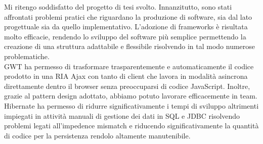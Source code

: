 Mi ritengo soddisfatto del progetto di tesi svolto.
Innanzitutto, sono stati affrontati
problemi pratici che riguardano la produzione di software, sia dal lato progettuale sia da quello implementativo.
L'adozione di frameworks è risultata molto efficacie, rendendo lo sviluppo del software più semplice permettendo la creazione di una struttura  adattabile e flessibile risolvendo in tal modo numerose problematiche.\\
GWT ha permesso di trasformare trasparentemente e automaticamente il codice prodotto in una RIA Ajax con tanto di client che lavora in modalità asincrona direttamente dentro il browser senza preoccuparsi di codice JavaScript.
Inoltre, grazie al pattern design adottato, abbiamo potuto lavorare efficacemente in team. \\
Hibernate ha permesso di ridurre significativamente i tempi  di sviluppo altrimenti
impiegati in attività manuali di gestione dei dati in SQL e JDBC risolvendo problemi legati all'impedence mismatch e riducendo significativamente la quantità di
codice per la persistenza rendolo altamente manutenibile.
